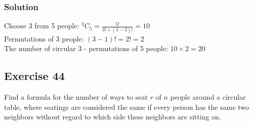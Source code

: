 \documentclass{article}
\theoremstyle{mytheoremstyle}
\theoremstyle{mytheoremstyle}
\theoremstyle{myproblemstyle}
\begin{document}
    \subsubsection*{Solution}
    Choose 3 from 5 people: \(^3C_5 = \frac{5!}{3! \times (5 - 3)!} = 10\)\\ 
    Permutations of 3 people: \((3 - 1)! = 2! = 2\)\\
    The number of circular 3 - permutations of 5 people: \(10 \times 2 = 20\)
    \subsection*{Exercise 44}
    Find a formula for the number of ways to seat \(r\) of \(n\) people around a circular table, where seatings are considered the same if every person has the same two neighbors without regard to which side these neighbors are sitting on.
\end{document}
